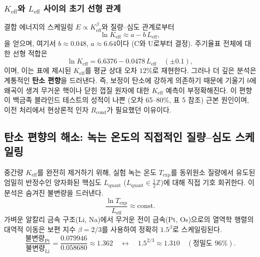 \documentclass[11pt,a4paper]{article}
\begin{document}
	\subsubsection{\(K_{\mathrm{eff}}\)와 \(L_{\mathrm{eff}}\) 사이의 초기 선형 관계}
	결합 에너지의 스케일링 \(E \propto K_{\mathrm{eff}}^{\beta}\)와 질량–심도 관계로부터
	\begin{equation}
		\ln K_{\mathrm{eff}} \approx a - b\,L_{\mathrm{eff}},
		\label{eq:lnK_vs_L_old}
	\end{equation}
	을 얻으며, 여기서 \(b \approx 0.048\), \(a \approx 6.64\)이다 (C와 U로부터 결정).  
	주기율표 전체에 대한 선형 적합은
	\[
	\ln K_{\mathrm{eff}} = 6.6376 - 0.0478\,L_{\mathrm{eff}} \quad (\pm 0.1),
	\]
	이며, 이는 표에 제시된 \(K_{\mathrm{eff}}\)를 평균 상대 오차 \(12\%\)로 재현한다.  
	그러나 더 깊은 분석은 계통적인 \textbf{탄소 편향}을 드러낸다. 즉, 보정이 탄소에 강하게 의존하기 때문에 기울기 \(b\)에 왜곡이 생겨 무거운 핵이나 닫힌 껍질 원자에 대한 \(K_{\mathrm{eff}}\) 예측이 부정확해진다. 이 편향이 백금족 블라인드 테스트의 성적이 나쁜 (오차 65–80\%, 표 5 참조) 근본 원인이며, 이전 처리에서 현상론적 인자 \(R_{\text{cond}}\)가 필요했던 이유이다.
	
	\subsection{탄소 편향의 해소: 녹는 온도의 직접적인 질량–심도 스케일링}
	\label{subsec:direct_mass}
	
	중간량 \(K_{\mathrm{eff}}\)를 완전히 제거하기 위해, 실험 녹는 온도 \(T_{\mathrm{exp}}\)를 동위원소 질량에서 유도된 엄밀히 반정수인 양자화된 핵심도 \(L_{\mathrm{quant}}\) (\(L_{\mathrm{quant}} \in \frac{1}{2}\mathbb{Z}\))에 대해 직접 기호 회귀한다. 이 분석은 숨겨진 불변량을 드러낸다.
	\[
	\frac{\ln T_{\mathrm{exp}}}{L_{\mathrm{eff}}}\approx \text{const}.
	\]
	가벼운 알칼리 금속 구조(Li, Na)에서 무거운 전이 금속(Pt, Os)으로의 열역학 행렬의 대역적 이동은 보편 지수 \(\beta = 2/3\)를 사용하여 정확히 \(1.5^{\beta}\)로 스케일링된다.
	\[
	\frac{\text{불변량}_{\mathrm{Pt}}}{\text{불변량}_{\mathrm{Li}}}=\frac{0.079946}{0.058680}\approx 1.362 \quad \longleftrightarrow \quad 1.5^{2/3}\approx 1.310 \quad (\text{정밀도 } 96\%).
	\]
	
\end{document}
